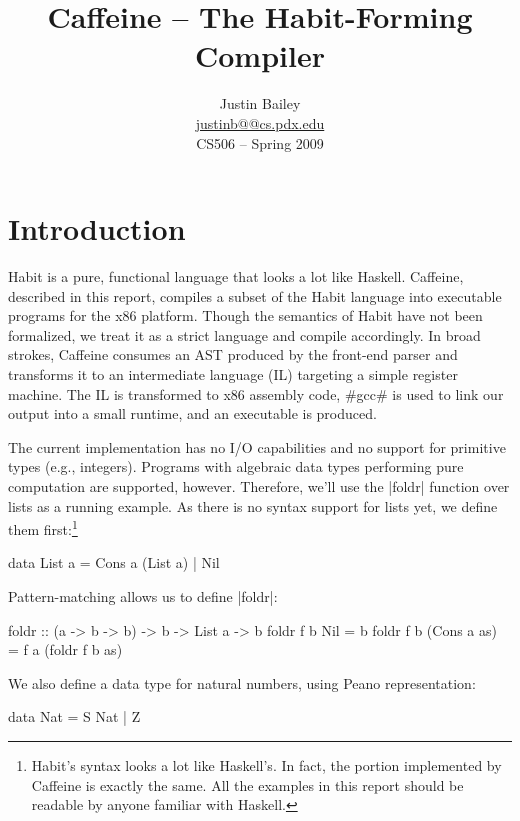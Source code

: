 \documentclass[11pt]{article}
\author{Justin Bailey \\ \url{justinb@@cs.pdx.edu} \\ CS506 -- Spring 2009}
\title{Caffeine -- The Habit-Forming Compiler}
\date{}
\begin{document}
\VerbatimFootnotes
\DefineShortVerb{\#}

\maketitle

\section{Introduction}

Habit is a pure, functional language that looks a lot like
Haskell. Caffeine, described in this report, compiles a subset of the
Habit language into executable programs for the x86 platform. Though
the semantics of Habit have not been formalized, we treat it as a
strict language and compile accordingly. In broad strokes, Caffeine
consumes an AST produced by the front-end parser and transforms it to an
intermediate language (IL) targeting a simple register machine. The
IL is transformed to x86 assembly code, #gcc# is used to link our 
output into a small runtime, and an executable is produced.

The current implementation has no I/O capabilities and no support for
primitive types (e.g., integers). Programs with algebraic data types
performing pure computation are supported, however. Therefore, we'll
use the |foldr| function over lists as a running example. As there is no syntax
support for lists yet, we define them
first:\footnote{Habit's syntax looks a lot like Haskell's. In fact, the
  portion implemented by Caffeine is exactly the same. All the
  examples in this report should be readable by anyone familiar with
  Haskell.}

\begin{code}
  data List a = Cons a (List a) | Nil
\end{code}

\noindent
Pattern-matching allows us to define |foldr|:

\begin{code}
foldr :: (a -> b -> b) -> b -> List a -> b
foldr f b Nil          = b
foldr f b (Cons a as)  = f a (foldr f b as)
\end{code}

\noindent
We also define a data type for natural numbers, using Peano representation:

\begin{code}
  data Nat = S Nat | Z
\end{code}
\end{document}
